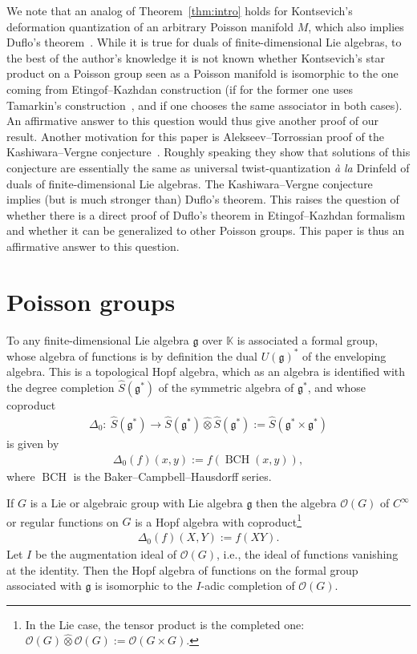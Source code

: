 \documentclass[10pt,a4paper]{amsart}
\numberwithin{equation}{section}
\newcommand{\mf}[1]{\mathfrak{#1}}
\newcommand{\ot}{\otimes}
\newcommand{\cO}{\mathcal O}
\newcommand{\kk}{\mathbb K}
\theoremstyle{definition}
\begin{document}
We note that an analog of Theorem~\ref{thm:intro} holds for Kontsevich's deformation quantization of an arbitrary Poisson manifold $M$, which also implies Duf\/lo's theorem~\cite{Cattaneo2002,Kontsevich2003,Manchon2003}. While it is true for duals of f\/inite-dimensional Lie algebras, to the best of the author's knowledge it is not known whether Kontsevich's star product on a Poisson group seen as a Poisson manifold is isomorphic to the one coming from Etingof--Kazhdan construction (if for the former one uses Tamarkin's construction~\cite{Tamarkin1998, Tamarkin1999}, and if one chooses the same associator in both cases). An af\/f\/irmative answer to this question would thus give another proof of our result. Another motivation for this paper is Alekseev--Torrossian proof of the Kashiwara--Vergne conjecture~\cite{Alekseev2012}. Roughly speaking they show that solutions of this conjecture are essentially the same as universal twist-quantization \emph{\`a la} Drinfeld of duals of f\/inite-dimensional Lie algebras. The Kashiwara--Vergne conjecture implies (but is much stronger than) Duf\/lo's theorem. This raises the question of whether there is a direct proof of Duf\/lo's theorem in Etingof--Kazhdan formalism and whether it can be generalized to other Poisson groups. This paper is thus an af\/f\/irmative answer to this question.

\section{Poisson groups}
To any f\/inite-dimensional Lie algebra $\mf g$ over $\kk$ is associated a formal group, whose algebra of functions is by def\/inition the dual $U(\mf g)^*$ of the enveloping algebra. This is a topological Hopf algebra, which as an algebra is identif\/ied with the degree completion $\widehat{S}(\mf g^*)$ of the symmetric algebra of $\mf g^*$, and whose coproduct
\begin{gather*}
\Delta_0\colon \ \widehat{S}(\mf g^*)\longrightarrow \widehat{S}(\mf g^*)\hat\ot \widehat{S}(\mf g^*):=\widehat{S}(\mf g^*\times \mf g^*)
\end{gather*}
is given by
\begin{gather*}
	\Delta_0(f)(x,y):=f(\operatorname{BCH}(x,y)),
\end{gather*}
where $\operatorname{BCH}$ is the Baker--Campbell--Hausdorf\/f series.

If $G$ is a Lie or algebraic group with Lie algebra $\mf g$ then the algebra $\cO(G)$ of $C^\infty$ or regular functions on $G$ is a Hopf algebra with coproduct\footnote{In the Lie case, the tensor product is the completed one: $\cO(G)\hat\ot \cO(G):=\cO(G\times G)$.}
\begin{gather*}
	\Delta_0(f)(X,Y):=f(XY).
\end{gather*}
Let $I$ be the augmentation ideal of $\cO(G)$, i.e., the ideal of functions vanishing at the identity. Then the Hopf algebra of functions on the formal group associated with $\mf g$ is isomorphic to the $I$-adic completion of $\cO(G)$.
\end{document}
